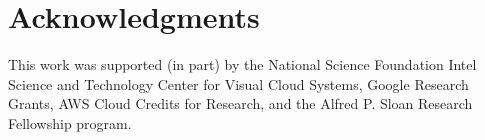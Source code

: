 \documentclass[11pt,times]{article}
\begin{document}
\section{Acknowledgments}
\label{sec:ack}

This work was supported (in part) by the National Science Foundation 
{Intel Science and Technology Center for Visual Cloud Systems},
Google Research Grants, 
AWS Cloud Credits for Research, and the
{Alfred P. Sloan Research Fellowship} program.


\balance

%
%
	
\end{document}
